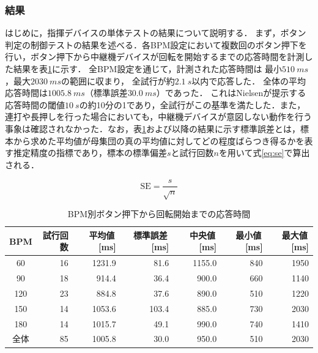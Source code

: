 \subsubsection{結果}
\label{sec:tanka_result}

はじめに，指揮デバイスの単体テストの結果について説明する．
まず，ボタン判定の制御テストの結果を述べる．各BPM設定において複数回のボタン押下を行い，ボタン押下から中継機デバイスが回転を開始するまでの応答時間を計測した結果を表\ref{tab:button_response}に示す．
全BPM設定を通じて，計測された応答時間は
最小$\SI{510}{ms}$，最大$\SI{2030}{ms}$の範囲に収まり，
全試行が約$\SI{2.1}{s}$以内で応答した．
全体の平均応答時間は$\SI{1005.8}{ms}$（標準誤差$\SI{30.0}{ms}$）であった．
これはNielsenが提示する応答時間の閾値$\SI{10}{s}$\cite{nielsen1993}の約10分の1であり，全試行がこの基準を満たした．また，連打や長押しを行った場合においても，中継機デバイスが意図しない動作を行う事象は確認されなかった．なお，表\ref{tab:button_response}および以降の結果に示す標準誤差とは，標本から求めた平均値が母集団の真の平均値に対してどの程度ばらつき得るかを表す推定精度の指標であり，標本の標準偏差$s$と試行回数$n$を用いて式\ref{eq:se}で算出される．

\begin{equation}
    \label{eq:se}
    \mathrm{SE} = \frac{s}{\sqrt{n}}
\end{equation}





\begin{table}[htbp]
    \centering
    \caption{BPM別ボタン押下から回転開始までの応答時間}
    \label{tab:button_response}
    \begin{tabular}{crrrrrr}
      \hline
      BPM & 試行回数 & 平均値\,[ms] & 標準誤差\,[ms] & 中央値\,[ms] & 最小値\,[ms] & 最大値\,[ms] \\
      \hline\hline
       60 & 16 & 1231.9 &  81.6 & 1155.0 &  840 & 1950 \\
       90 & 18 &  914.4 &  36.4 &  900.0 &  660 & 1140 \\
      120 & 23 &  884.8 &  37.6 &  890.0 &  510 & 1220 \\
      150 & 14 & 1053.6 & 103.4 &  885.0 &  730 & 2030 \\
      180 & 14 & 1015.7 &  49.1 &  990.0 &  740 & 1410 \\
      \hline
      全体 & 85 & 1005.8 &  30.0 & 950.0 & 510 & 2030 \\
      \hline
    \end{tabular}
\end{table}


